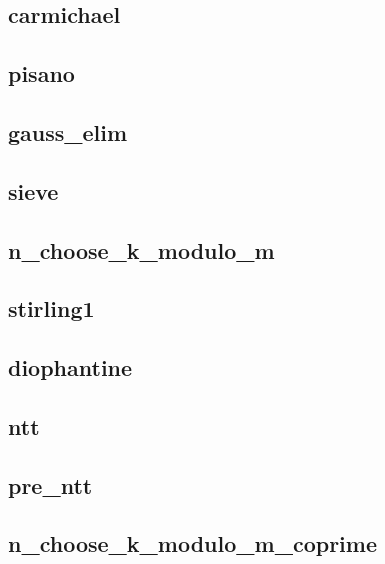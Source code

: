 \subsection{carmichael}
\raggedbottom
\hrulefill
\subsection{pisano}
\raggedbottom
\hrulefill
\subsection{gauss_elim}
\raggedbottom
\hrulefill
\subsection{sieve}
\raggedbottom
\hrulefill
\subsection{n_choose_k_modulo_m}
\raggedbottom
\hrulefill
\subsection{stirling1}
\raggedbottom
\hrulefill
\subsection{diophantine}
\raggedbottom
\hrulefill
\subsection{ntt}
\raggedbottom
\hrulefill
\subsection{pre_ntt}
\raggedbottom
\hrulefill
\subsection{n_choose_k_modulo_m_coprime}
\raggedbottom
\hrulefill

